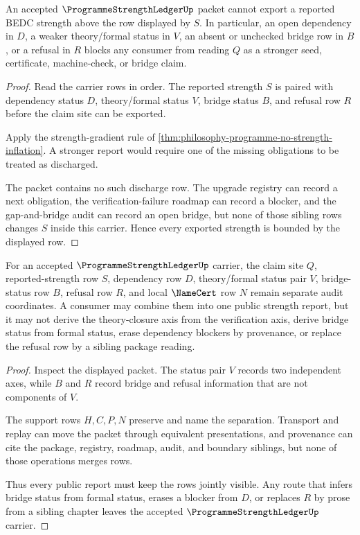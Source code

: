 \begin{theorem}
\label{thm:programme-strength-ledger-no-strength-inflation}
An accepted $\ProgrammeStrengthLedgerUp$ packet cannot export a reported BEDC strength above the row displayed by $S$. In particular, an open dependency in $D$, a weaker theory/formal status in $V$, an absent or unchecked bridge row in $B$, or a refusal in $R$ blocks any consumer from reading $Q$ as a stronger seed, certificate, machine-check, or bridge claim.
\end{theorem}
\begin{proof}
Read the carrier rows in order. The reported strength $S$ is paired with dependency status $D$, theory/formal status $V$, bridge status $B$, and refusal row $R$ before the claim site can be exported.

Apply the strength-gradient rule of \autoref{thm:philosophy-programme-no-strength-inflation}. A stronger report would require one of the missing obligations to be treated as discharged.

The packet contains no such discharge row. The upgrade registry can record a next obligation, the verification-failure roadmap can record a blocker, and the gap-and-bridge audit can record an open bridge, but none of those sibling rows changes $S$ inside this carrier. Hence every exported strength is bounded by the displayed row.
\end{proof}

\begin{theorem}
\label{thm:programme-strength-ledger-axis-separation}
For an accepted $\ProgrammeStrengthLedgerUp$ carrier, the claim site $Q$, reported-strength row $S$, dependency row $D$, theory/formal status pair $V$, bridge-status row $B$, refusal row $R$, and local $\NameCert$ row $N$ remain separate audit coordinates. A consumer may combine them into one public strength report, but it may not derive the theory-closure axis from the verification axis, derive bridge status from formal status, erase dependency blockers by provenance, or replace the refusal row by a sibling package reading.
\end{theorem}
\begin{proof}
Inspect the displayed packet. The status pair $V$ records two independent axes, while $B$ and $R$ record bridge and refusal information that are not components of $V$.

The support rows $H,C,P,N$ preserve and name the separation. Transport and replay can move the packet through equivalent presentations, and provenance can cite the package, registry, roadmap, audit, and boundary siblings, but none of those operations merges rows.

Thus every public report must keep the rows jointly visible. Any route that infers bridge status from formal status, erases a blocker from $D$, or replaces $R$ by prose from a sibling chapter leaves the accepted $\ProgrammeStrengthLedgerUp$ carrier.
\end{proof}


